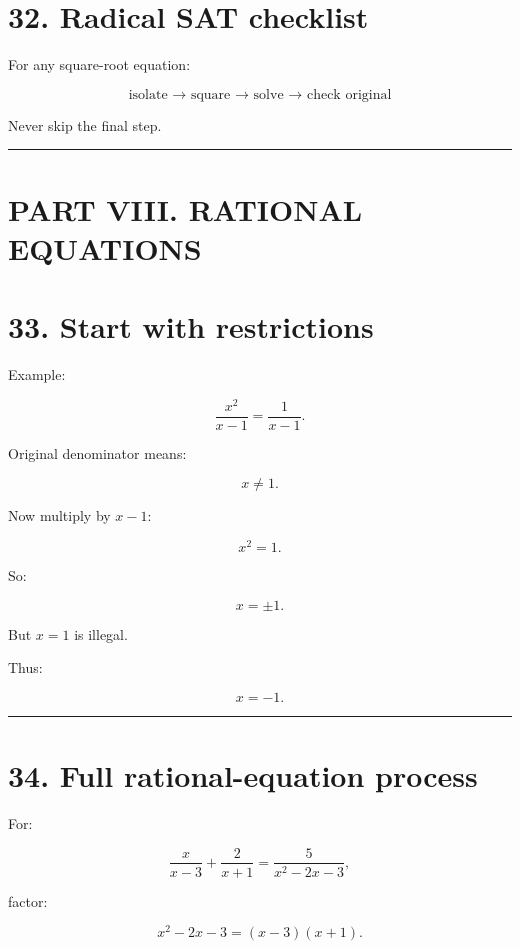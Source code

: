 \documentclass[
]{article}
\begin{document}
\section{32. Radical SAT checklist}\label{radical-sat-checklist}

For any square-root equation:

\[
\boxed{\text{isolate → square → solve → check original}}
\]

Never skip the final step.

\begin{center}\rule{0.5\linewidth}{0.5pt}\end{center}

\section{PART VIII. RATIONAL
EQUATIONS}\label{part-viii.-rational-equations}

\section{33. Start with restrictions}\label{start-with-restrictions}

Example:

\[
\frac{x^2}{x-1}=\frac1{x-1}.
\]

Original denominator means:

\[
\boxed{x\neq1}.
\]

Now multiply by \(x-1\):

\[
x^2=1.
\]

So:

\[
x=\pm1.
\]

But \(x=1\) is illegal.

Thus:

\[
\boxed{x=-1}.
\]

\begin{center}\rule{0.5\linewidth}{0.5pt}\end{center}

\section{34. Full rational-equation
process}\label{full-rational-equation-process}

For:

\[
\frac{x}{x-3}
+
\frac2{x+1}
=
\frac5{x^2-2x-3},
\]

factor:

\[
x^2-2x-3=(x-3)(x+1).
\]
\end{document}
